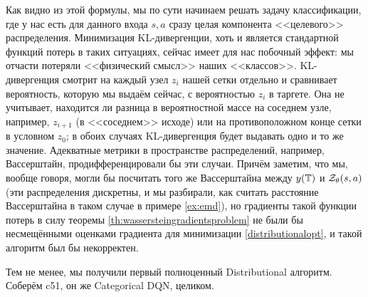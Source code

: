 Как видно из этой формулы, мы по сути начинаем решать задачу классификации, где у нас есть для данного входа $s, a$ сразу целая компонента <<целевого>> распределения. Минимизация KL-дивергенции, хоть и является стандартной функций потерь в таких ситуациях, сейчас имеет для нас побочный эффект: мы отчасти потеряли <<физический смысл>> наших <<классов>>. KL-дивергенция смотрит на каждый узел $z_i$ нашей сетки отдельно и сравнивает вероятность, которую мы выдаём сейчас, с вероятностью $z_i$ в таргете. Она не учитывает, находится ли разница в вероятностной массе на соседнем узле, например, $z_{i+1}$ (в <<соседнем>> исходе) или на противоположном конце сетки в условном $z_0$; в обоих случаях KL-дивергенция будет выдавать одно и то же значение. Адекватные метрики в пространстве распределений, например, Вассерштайн, продифференцировали бы эти случаи. Причём заметим, что мы, вообще говоря, могли бы посчитать того же Вассерштайна между $y(\mathbb{T})$ и $\mathcal{Z}_{\theta}(s, a)$ (эти распределения дискретны, и мы разбирали, как считать расстояние Вассерштайна в таком случае в примере \ref{ex:emd}), но градиенты такой функции потерь в силу теоремы \ref{th:wassersteingradientsproblem} не были бы несмещёнными оценками градиента для минимизации \eqref{distributionalopt}, и такой алгоритм был бы некорректен.

Тем не менее, мы получили первый полноценный Distributional алгоритм. Соберём c51, он же Categorical DQN, целиком.

